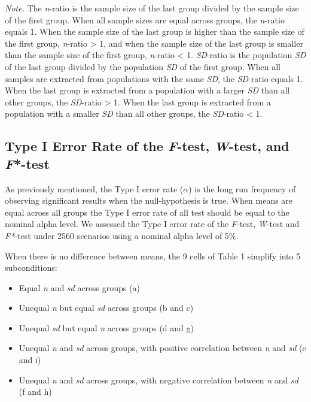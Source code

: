 \documentclass[man,floatsintext]{apa6}
\providecommand{\tightlist}{%
  \setlength{\itemsep}{0pt}\setlength{\parskip}{0pt}}
\begin{document}
\emph{Note.} The \emph{n}-ratio is the sample size of the last group divided by the sample size of the first group. When all sample sizes are equal across groups, the \emph{n}-ratio equals 1. When the sample size of the last group is higher than the sample size of the first group, \emph{n}-ratio \textgreater{} 1, and when the sample size of the last group is smaller than the sample size of the first group, \emph{n}-ratio \textless{} 1. \emph{SD}-ratio is the population \emph{SD} of the last group divided by the population \emph{SD} of the first group. When all samples are extracted from populations with the same \emph{SD}, the \emph{SD}-ratio equals 1. When the last group is extracted from a population with a larger \emph{SD} than all other groups, the \emph{SD}-ratio \textgreater{} 1. When the last group is extracted from a population with a smaller \emph{SD} than all other groups, the \emph{SD}-ratio \textless{} 1.

\hypertarget{type-i-error-rate-of-the-f-test-w-test-and-f-test}{%
\subsection{\texorpdfstring{Type I Error Rate of the \emph{F}-test, \emph{W}-test, and \emph{F}*-test}{Type I Error Rate of the F-test, W-test, and F*-test}}\label{type-i-error-rate-of-the-f-test-w-test-and-f-test}}

As previously mentioned, the Type I error rate (\(\alpha\)) is the long run frequency of observing significant results when the null-hypothesis is true. When means are equal across all groups the Type I error rate of all test should be equal to the nominal alpha level. We assessed the Type I error rate of the \emph{F}-test, \emph{W}-test and \emph{F*}-test under 2560 scenarios using a nominal alpha level of 5\%.

When there is no difference between means, the 9 cells of Table 1 simplify into 5 subconditions:

\begin{itemize}
\tightlist
\item
  Equal \emph{n} and \emph{sd} across groups (a)\\
\item
  Unequal \emph{n} but equal \emph{sd} across groups (b and c)\\
\item
  Unequal \emph{sd} but equal \emph{n} across groups (d and g)\\
\item
  Unequal \emph{n} and \emph{sd} across groups, with positive correlation between \emph{n} and \emph{sd} (e and i)\\
\item
  Unequal \emph{n} and \emph{sd} across groups, with negative correlation between \emph{n} and \emph{sd} (f and h)
\end{itemize}
\end{document}
